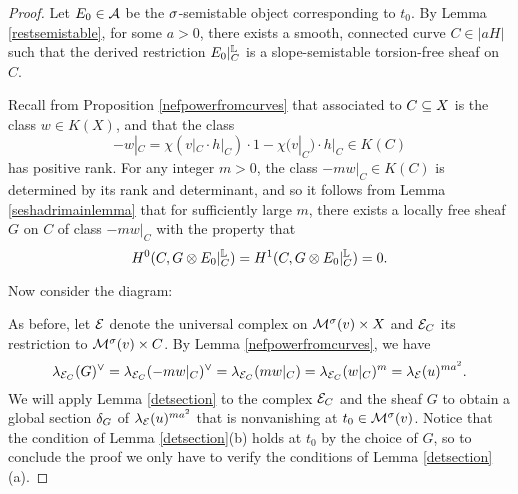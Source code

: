 \documentclass[letterpaper,11pt]{amsart}%
\theoremstyle{remark}
\begin{document}
\begin{proof}
    Let $E_0 \in \mathcal{A}$ be the $\sigma$-semistable object corresponding to $t_0$. By Lemma \ref{restsemistable}, for some $a > 0$, there exists a smooth, connected curve $C \in |a H|$ such that the derived restriction $E_0|_C^{\mathbb{L}}$ is a slope-semistable torsion-free sheaf on $C$.
    
    Recall from Proposition \ref{nefpowerfromcurves} that associated to $C \subseteq X$ is the class $w \in K(X)$, and that the class 
    \[ -w|_C = \chi(v|_C \cdot h|_C) \cdot 1 - \chi(v|_C) \cdot h|_C \in K(C) \] 
    has positive rank. For any integer $m > 0$, the class $-m w|_C \in K(C)$ is determined by its rank and determinant, and so it follows from Lemma \ref{seshadrimainlemma} that for sufficiently large $m$, there exists a locally free sheaf $G$ on $C$ of class $-m w|_C$ with the property that
    \[ H^0(C, G \otimes E_0|_C^{\mathbb{L}}) = H^1(C, G \otimes E_0|_C^{\mathbb{L}}) = 0. \]
    
    Now consider the diagram:
    \begin{center}
    \end{center}
    As before, let $\mathcal{E}$ denote the universal complex on $\mathcal{M}^\sigma(v) \times X$ and $\mathcal{E}_C$ its restriction to $\mathcal{M}^\sigma(v) \times C$. By Lemma \ref{nefpowerfromcurves}, we have
    \[ \lambda_{\mathcal{E}_C}(G)^\vee = \lambda_{\mathcal{E}_C}(-m w|_C)^\vee = \lambda_{\mathcal{E}_C}(m w|_C) = \lambda_{\mathcal{E}_C}(w|_C)^m = \lambda_{\mathcal{E}}(u)^{m a^2}. \]
    We will apply Lemma \ref{detsection} to the complex $\mathcal{E}_C$ and the sheaf $G$ to obtain a global section $\delta_G$ of $\lambda_{\mathcal{E}}(u)^{m a^2}$ that is nonvanishing at $t_0 \in \mathcal{M}^\sigma(v)$. Notice that the condition of Lemma \ref{detsection}(b) holds at $t_0$ by the choice of $G$, so to conclude the proof we only have to verify the conditions of Lemma \ref{detsection}(a).
    

\end{proof}
\end{document}
